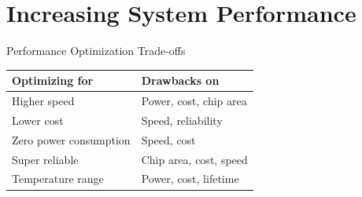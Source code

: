 \section{Increasing System Performance}

\begin{concept}{Performance Optimization Trade-offs}
  \vspace{2mm}\\
\begin{tabular}{|l|l|}
\hline
\textbf{Optimizing for} & \textbf{Drawbacks on} \\
\hline
Higher speed & Power, cost, chip area \\
\hline
Lower cost & Speed, reliability \\
\hline
Zero power consumption & Speed, cost \\
\hline
Super reliable & Chip area, cost, speed \\
\hline
Temperature range & Power, cost, lifetime \\
\hline
\end{tabular}
\end{concept}

